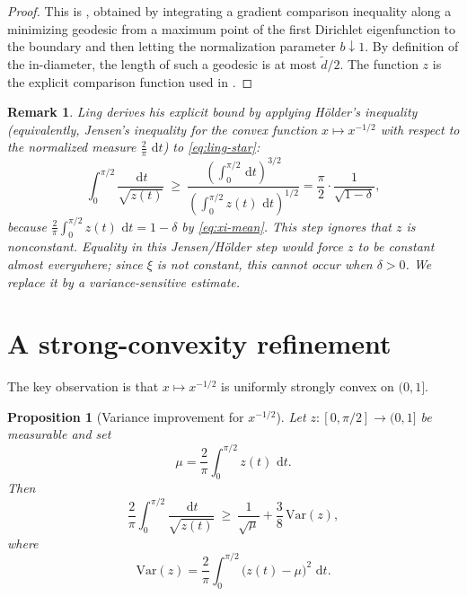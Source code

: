 \documentclass[11pt]{article}
\newtheorem{proposition}[theorem]{Proposition}
\newtheorem{remark}[theorem]{Remark}
\newcommand{\Var}{\mathrm{Var}}
\newcommand{\dd}{\,\mathrm{d}}
\newcommand{\de}{\tilde d}
\begin{document}
\begin{proof}
This is \cite[(44)]{Ling2006}, obtained by integrating a gradient comparison inequality along a minimizing geodesic from a maximum point of the first Dirichlet eigenfunction to the boundary and then letting the normalization parameter $b\downarrow 1$.
By definition of the in-diameter, the length of such a geodesic is at most $\de/2$.
The function $z$ is the explicit comparison function used in \cite[(35)]{Ling2006}.
\end{proof}

\begin{remark}
Ling derives his explicit bound by applying H\"older's inequality (equivalently, Jensen's inequality for the convex function $x\mapsto x^{-1/2}$ with respect to the normalized measure $\tfrac{2}{\pi}\,\dd t$) to \eqref{eq:ling-star}:
\begin{equation}
\int_{0}^{\pi/2}\frac{\dd t}{\sqrt{z(t)}}
\ \ge\
\frac{\left(\int_0^{\pi/2}\dd t\right)^{3/2}}{\left(\int_0^{\pi/2} z(t)\,\dd t\right)^{1/2}}
=
\frac{\pi}{2}\cdot\frac{1}{\sqrt{1-\delta}},
\end{equation}
because $\frac{2}{\pi}\int_0^{\pi/2} z(t)\,\dd t=1-\delta$ by \eqref{eq:xi-mean}.
This step ignores that $z$ is nonconstant. Equality in this Jensen/H\"older step would force $z$ to be constant almost everywhere; since $\xi$ is not constant, this cannot occur when $\delta>0$.
We replace it by a variance-sensitive estimate.
\end{remark}

\section{A strong-convexity refinement}

The key observation is that $x\mapsto x^{-1/2}$ is uniformly strongly convex on $(0,1]$.

\begin{proposition}[Variance improvement for $x^{-1/2}$]
\label{prop:variance}
Let $z:[0,\pi/2]\to(0,1]$ be measurable and set
\begin{equation}
\mu = \frac{2}{\pi}\int_{0}^{\pi/2} z(t)\,\dd t.
\end{equation}
Then
\begin{equation}
\label{eq:variance-ineq}
\frac{2}{\pi}\int_{0}^{\pi/2}\frac{\dd t}{\sqrt{z(t)}}
\ \ge\
\frac{1}{\sqrt{\mu}}+\frac{3}{8}\,\Var(z),
\end{equation}
where
\begin{equation}
\Var(z)=\frac{2}{\pi}\int_{0}^{\pi/2}\bigl(z(t)-\mu\bigr)^2\,\dd t.
\end{equation}
\end{proposition}
\end{document}
